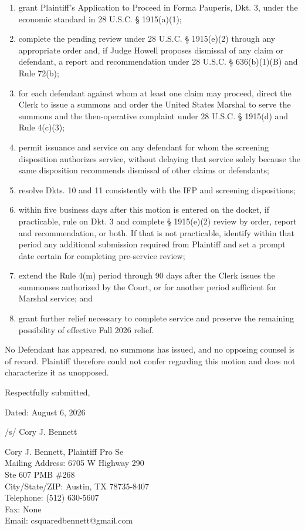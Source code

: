 \documentclass[12pt]{article}
\makeatletter
\providecommand{\FilingPlaintiffName}{Cory J. Bennett}
\providecommand{\FilingPlaintiffMailingLineOne}{6705 W Highway 290}
\providecommand{\FilingPlaintiffMailingLineTwo}{Ste 607 PMB \#268}
\providecommand{\FilingPlaintiffMailingCityStateZip}{Austin, TX 78735-8407}
\providecommand{\FilingPlaintiffTelephone}{(512) 630-5607}
\providecommand{\FilingPlaintiffFax}{None}
\providecommand{\FilingPlaintiffEmail}{csquaredbennett@gmail.com}
\providecommand{\SignatureFourOnLine}[1][]{/s/ \FilingPlaintiffName}
\newcommand{\MotionDate}{August 6, 2026}
\makeatother
\begin{document}
\begin{enumerate}[label=\Alph*.,leftmargin=0.52in]
\item grant Plaintiff's Application to Proceed in Forma Pauperis, Dkt. 3, under the economic standard in 28 U.S.C. § 1915(a)(1);
\item complete the pending review under 28 U.S.C. § 1915(e)(2) through any appropriate order and, if Judge Howell proposes dismissal of any claim or defendant, a report and recommendation under 28 U.S.C. § 636(b)(1)(B) and Rule 72(b);
\item for each defendant against whom at least one claim may proceed, direct the Clerk to issue a summons and order the United States Marshal to serve the summons and the then-operative complaint under 28 U.S.C. § 1915(d) and Rule 4(c)(3);
\item permit issuance and service on any defendant for whom the screening disposition authorizes service, without delaying that service solely because the same disposition recommends dismissal of other claims or defendants;
\item resolve Dkts. 10 and 11 consistently with the IFP and screening dispositions;
\item within five business days after this motion is entered on the docket, if practicable, rule on Dkt. 3 and complete § 1915(e)(2) review by order, report and recommendation, or both. If that is not practicable, identify within that period any additional submission required from Plaintiff and set a prompt date certain for completing pre-service review;
\item extend the Rule 4(m) period through 90 days after the Clerk issues the summonses authorized by the Court, or for another period sufficient for Marshal service; and
\item grant further relief necessary to complete service and preserve the remaining possibility of effective Fall 2026 relief.
\end{enumerate}

No Defendant has appeared, no summons has issued, and no opposing counsel is of record. Plaintiff therefore could not confer regarding this motion and does not characterize it as unopposed.

\singlespacing
\vspace{0.25em}
\noindent Respectfully submitted,

\vspace{0.5em}
\noindent Dated: \MotionDate

\vspace{1.0em}
\noindent \SignatureFourOnLine[width=1.6in]

\vspace{0.4em}
\noindent Cory J. Bennett, Plaintiff Pro Se\\
Mailing Address: \FilingPlaintiffMailingLineOne\\
\hspace*{1.18in}\FilingPlaintiffMailingLineTwo\\
City/State/ZIP: \FilingPlaintiffMailingCityStateZip\\
Telephone: \FilingPlaintiffTelephone\\
Fax: \FilingPlaintiffFax\\
Email: \FilingPlaintiffEmail
\end{document}
